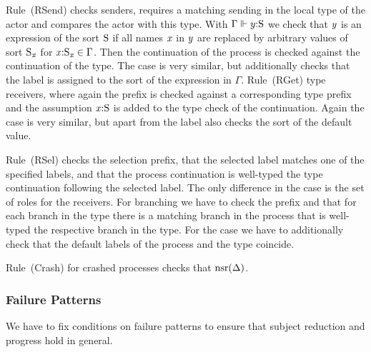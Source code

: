 Rule~(\textsf{RSend}) checks \strongR senders, \ie requires a matching \strongR sending in the local type of the actor and compares the actor with this type.
With $ \Gamma \Vdash \Typed{\Expr[y]}{\Sort} $ we check that $ \Expr[y] $ is an expression of the sort $ \Sort $ if all names $ \Args $ in $ \Expr[y] $ are replaced by arbitrary values of sort $ \Sort_{\Args} $ for $ \Typed{\Args}{\Sort_{\Args}} \in \Gamma $.
Then the continuation of the process is checked against the continuation of the type.
The \unrel case is very similar, but additionally checks that the label is assigned to the sort of the expression in $ \Gamma $.
Rule~(\textsf{RGet}) type \strongR receivers, where again the prefix is checked against a corresponding type prefix and the assumption $ \Typed{\Args}{\Sort} $ is added to the type check of the continuation.
Again the \unrel case is very similar, but apart from the label also checks the sort of the default value.

Rule~(\textsf{RSel}) checks the \strongR selection prefix, that the selected label matches one of the specified labels, and that the process continuation is well-typed \wrt the type continuation following the selected label.
The only difference in the \weakR case is the set of roles for the receivers.
For \strongR branching we have to check the prefix and that for each branch in the type there is a matching branch in the process that is well-typed \wrt the respective branch in the type.
For the \weakR case we have to additionally check that the default labels of the process and the type coincide.

Rule~(\textsf{Crash}) for crashed processes checks that $ \Unreliable{\Delta} $.

\subsubsection{Failure Patterns}
We have to fix conditions on failure patterns to ensure that subject reduction and progress hold in general.

